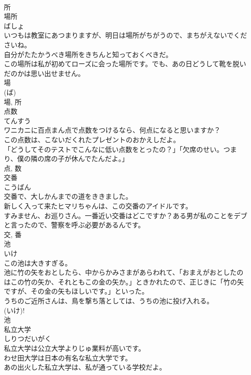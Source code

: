 \documentclass[8pt]{extreport}
\begin{document}
\begin{CJK}{UTF8}{min}
\\	所	
\\	場所	
\\	ばしょ	
\\	いつもは教室にあつまりますが、明日は場所がちがうので、まちがえないでくださいね。	
\\	自分がたたかうべき場所をきちんと知っておくべきだ。	
\\	この場所は私が初めてローズに会った場所です。でも、あの日どうして靴を脱いだのかは思い出せません。	
\\	場 
\\	(ば) 
\\	場, 所	
\\	点数	
\\	てんすう	
\\	ワニカニに百点まん点で点数をつけるなら、何点になると思いますか？	
\\	この点数は、こないだくれたプレゼントのおかえしだよ。	
\\	「どうしてそのテストでこんなに低い点数をとったの？」「欠席のせい。つまり、僕の隣の席の子が休んでたんだよ。」	
\\	点, 数	
\\	交番	
\\	こうばん	
\\	交番で、大しかんまでの道をききました。	
\\	新しく入って来たヒマリちゃんは、この交番のアイドルです。	
\\	すみません、お巡りさん。一番近い交番はどこですか？ある男が私のことをデブと言ったので、警察を呼ぶ必要があるんです。	
\\	交, 番	
\\	池	
\\	いけ	
\\	この池は大きすぎる。	
\\	池に竹の矢をおとしたら、中からかみさまがあらわれて、「おまえがおとしたのはこの竹の矢か、それともこの金の矢か。」ときかれたので、正じきに「竹の矢ですが、その金の矢もほしいです。」といった。	
\\	うちのご近所さんは、鳥を撃ち落としては、うちの池に投げ入れる。	
\\	(いけ)! 
\\	池	
\\	私立大学	
\\	しりつだいがく	
\\	私立大学は公立大学よりじゅ業料が高いです。	
\\	わせ田大学は日本の有名な私立大学です。	
\\	あの出火した私立大学は、私が通っている学校だよ。	

\end{CJK}
\end{document}
